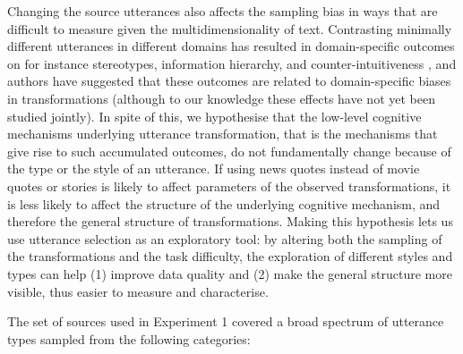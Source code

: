 \documentclass[a4paper,fleqn]{cas-dc}
\begin{document}
Changing the source utterances also affects the sampling bias in ways
that are difficult to measure given the multidimensionality of text.
Contrasting minimally different utterances in different domains has
resulted in domain-specific outcomes on for instance stereotypes,
information hierarchy, and counter-intuitiveness
\citep{kashima_maintaining_2000,mesoudi_bias_2006,barrett_spreading_2001,mesoudi_multiple_2008},
and authors have suggested that these outcomes are related to
domain-specific biases in transformations (although to our knowledge
these effects have not yet been studied jointly). In spite of this, we
hypothesise that the low-level cognitive mechanisms underlying utterance
transformation, that is the mechanisms that give rise to such
accumulated outcomes, do not fundamentally change because of the type or
the style of an utterance. If using news quotes instead of movie quotes
or stories is likely to affect parameters of the observed
transformations, it is less likely to affect the structure of the
underlying cognitive mechanism, and therefore the general structure of
transformations. Making this hypothesis lets us use utterance selection
as an exploratory tool: by altering both the sampling of the
transformations and the task difficulty, the exploration of different
styles and types can help (1) improve data quality and (2) make the
general structure more visible, thus easier to measure and characterise.

The set of sources used in Experiment 1 covered a broad spectrum of
utterance types sampled from the following categories:
\end{document}
